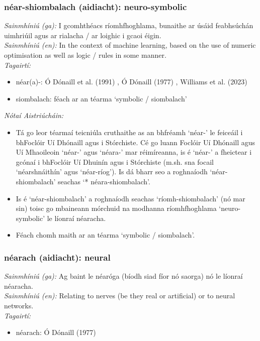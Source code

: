 \subsubsection*{néar-shiombalach (aidiacht): neuro-symbolic}
 \noindent \textit{Sainmhíniú (ga):} I gcomhthéacs ríomhfhoghlama, bunaithe ar úsáid feabhsúchán uimhriúil agus ar rialacha / ar loighic i gcaoi éigin.
\\
 \noindent \textit{Sainmhíniú (en):} In the context of machine learning, based on the use of numeric optimisation as well as logic / rules in some manner.
\\
 \noindent \textit{Tagairtí:}
\begin{itemize}
	\item néar(a)-: Ó Dónaill et al. (1991) \cite{focloir-beag}, Ó Dónaill (1977) \cite{odonaill}, Williams et al. (2023) \cite{storchiste}
	\item siombalach: féach ar an téarma `symbolic / siombalach'
\end{itemize}

 \noindent \textit{Nótaí Aistriúcháin:}
\begin{itemize}
	\item Tá go leor téarmaí teicniúla cruthaithe as an bhfréamh `néar-' le feiceáil i bhFoclóir Uí Dhónaill agus i Stórchiste. Cé go luann Foclóir Uí Dhónaill agus Uí Mhaoileoin `néar-' agus `néara-' mar réimíreanna, is é `néar-' a fheictear i gcónaí i bhFoclóir Uí Dhuinín agus i Stórchiste (m.sh. sna focail `néarshnáithín' agus `néar-ríog'). Is dá bharr seo a roghnaíodh `néar-shiombalach' seachas `* néara-shiombalach'.
	\item Is é `néar-shiombalach' a roghnaíodh seachas `ríomh-shiombalach' (nó mar sin) toisc go mbaineann mórchuid na modhanna ríomhfhoghlama `neuro-symbolic' le líonraí néaracha.
	\item Féach chomh maith ar an téarma `symbolic / siombalach'.
\end{itemize}


\subsubsection*{néarach (aidiacht): neural}
 \noindent \textit{Sainmhíniú (ga):} Ag baint le néaróga (bíodh siad fíor nó saorga) nó le líonraí néaracha.
\\
 \noindent \textit{Sainmhíniú (en):} Relating to nerves (be they real or artificial) or to neural networks.
\\
 \noindent \textit{Tagairtí:}
\begin{itemize}
	\item néarach: Ó Dónaill (1977) \cite{odonaill}
\end{itemize}

